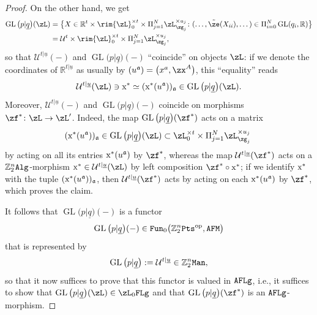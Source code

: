 \documentclass[pdftex]{sigma}%
\newcommand{\op}[1]{\operatorname{#1}}
\newcommand{\R}{{\mathbb R}}
\newcommand{\Z}{{\mathbb Z}}
\def\ul{\underline}
\def\cU{\mathcal{U}}
\def\ul{\underline}
\newcommand{\0}{\otimes}
\newcommand{\z}{\Z_2^n}
\numberwithin{equation}{section}
\begin{document}
\begin{proof}
On the other hand, we get
\begin{align*}
\op{GL}\big(p|\ul q\big)(\zL)&=\big\{X\in\R^t\times \rim{\zL}^{\times t}_0\times\Pi_{j=1}^N\zL_{\zg_j}^{\times u_j}\colon (
\dots,\tilde{\ze}(X_{ii}),\dots)\in\Pi_{i=0}^N\op{GL}(q_i,\R)\big\}
\\
&=\cU^t\times\rim{\zL}^{\times t}_0\times\Pi_{j=1}^N\zL_{\zg_j}^{\times u_j},
\end{align*}
so that $\cU^{t|\ul u}(-)$ and $\op{GL}\big(p|\ul q\big)(-)$ ``coincide'' on objects $\zL$: if we denote the coordinates of $\R^{t|\ul u}$ as usually by $(u^{\mathfrak{a}})=\big(x^a,\zx^A\big)$, this ``equality'' reads
\[
\cU^{t|\ul u}(\zL)\ni{\rm x}^*\simeq ({\rm x}^*(u^{\mathfrak{a}}))_{\mathfrak{a}}\in \op{GL}\big(p|\ul q\big)(\zL).
\]
Moreover, $\cU^{t|\ul u}(-)$ and $\op{GL}\big(p|\ul q\big)(-)$ coincide on morphisms $\zf^*\colon \zL\to\zL'$. Indeed, the map $\op{GL}\big(p|\ul q\big)(\zf^*)$ acts on a matrix
\[
({\rm x}^*(u^{\mathfrak{a}}))_{\mathfrak{a}}\in\op{GL}\big(p|\ul q\big)(\zL)\subset\zL^{\times t}_0\times\Pi_{j=1}^N\zL_{\zg_j}^{\times u_j}\;
\]
by acting on all its entries ${\rm x}^*(u^{\mathfrak{a}})$ by $\zf^*$, whereas the map $\cU^{t|\ul u}(\zf^*)$ acts on a $\z{\tt Alg}$-morphism ${\rm x}^*\in\cU^{t|\ul u}(\zL)$ by left composition $\zf^*\circ{\rm x}^*$; if we identify ${\rm x}^*$ with the tuple $({\rm x}^*(u^{\mathfrak{a}}))_{\mathfrak{a}}$, then $\cU^{t|\ul u}(\zf^*)$ acts by acting on each ${\rm x}^*(u^{\mathfrak{a}})$ by $\zf^*$, which proves the claim.

It follows that $\op{GL}\big(p|\ul q\big)(-)$ is a functor
\[
\op{GL}\big(p|\ul q\big)(-)\in{\tt Fun}_0\big(\z{\tt Pts}^{\op{op}},{\tt AFM}\big)
\]
that is represented by
\begin{gather}\label{GL3}
\op{GL}\big(p|\ul q\big):=\cU^{t|\ul u}\in\z{\tt Man},
\end{gather}
so that it now suffices to prove that this functor is valued in ${\tt AFLg}$, i.e., it suffices to show that $\op{GL}\big(p|\ul q\big)(\zL)\in\zL_0{\tt FLg}$ and that $\op{GL}\big(p|\ul q\big)(\zf^*)$ is an ${\tt AFLg}$-morphism.


\end{proof}
\end{document}
